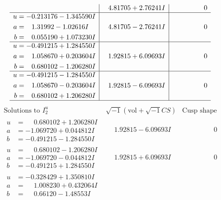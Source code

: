 \documentclass[1p]{elsarticle_modified}
\theoremstyle{definition}
\newcommand{\I}{\sqrt{-1}}
\begin{document}
$$\begin{array}{c|c|c}
 & \phantom{-}4.81705 + 2.76241 I & \phantom{-0.000000 } 0 \\ \hline\begin{aligned}
u &= -0.213176 - 1.345590 I \\
a &= \phantom{-}1.31992 - 1.02616 I \\
b &= \phantom{-}0.055190 + 1.073230 I\end{aligned}
 & \phantom{-}4.81705 - 2.76241 I & \phantom{-0.000000 } 0 \\ \hline\begin{aligned}
u &= -0.491215 + 1.284550 I \\
a &= \phantom{-}1.058670 + 0.203604 I \\
b &= \phantom{-}0.680102 - 1.206280 I\end{aligned}
 & \phantom{-}1.92815 + 6.09693 I & \phantom{-0.000000 } 0 \\ \hline\begin{aligned}
u &= -0.491215 - 1.284550 I \\
a &= \phantom{-}1.058670 - 0.203604 I \\
b &= \phantom{-}0.680102 + 1.206280 I\end{aligned}
 & \phantom{-}1.92815 - 6.09693 I & \phantom{-0.000000 } 0\\
 \hline 
 \end{array}$$\newpage$$\begin{array}{c|c|c}  
\text{Solutions to }I^u_{2}& \I (\text{vol} + \sqrt{-1}CS) & \text{Cusp shape}\\
 \hline 
\begin{aligned}
u &= \phantom{-}0.680102 + 1.206280 I \\
a &= -1.069720 + 0.044812 I \\
b &= -0.491215 - 1.284550 I\end{aligned}
 & \phantom{-}1.92815 - 6.09693 I & \phantom{-0.000000 } 0 \\ \hline\begin{aligned}
u &= \phantom{-}0.680102 - 1.206280 I \\
a &= -1.069720 - 0.044812 I \\
b &= -0.491215 + 1.284550 I\end{aligned}
 & \phantom{-}1.92815 + 6.09693 I & \phantom{-0.000000 } 0 \\ \hline\begin{aligned}
u &= -0.328429 + 1.350810 I \\
a &= \phantom{-}1.008230 + 0.432064 I \\
b &= \phantom{-}0.66120 - 1.48553 I\end{aligned}

\end{array}$$
\end{document}
